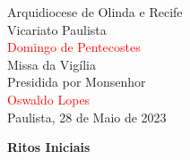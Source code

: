 \documentclass{book}
\begin{document}
\pagestyle{empty}

\begin{center}

    \huge Arquidiocese de Olinda e Recife
    \vspace{0.3cm} \\
    \LARGE Vicariato Paulista
    \vspace{3cm} \\
    \textcolor{red}{\Huge Domingo de Pentecostes}
    \vspace{3cm} \\
    \huge Missa da Vigília
    \vspace{0.3cm} \\
    \LARGE Presidida por Monsenhor
    \vspace{0.3cm} \\
    \textcolor{red}{\Huge Oswaldo Lopes}
    \vspace{\fill}\\
    \LARGE Paulista, 28 de Maio de 2023

\end{center}

\newpage

\begin{center}

    \textbf{Ritos Iniciais}

\end{center}
\end{document}
